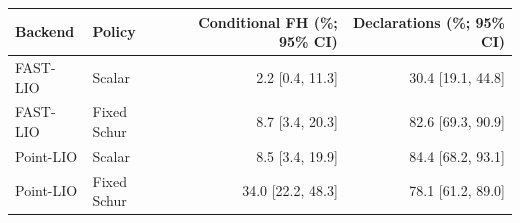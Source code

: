 \begin{tabular}{@{}llrr@{}}
\toprule
Backend & Policy & Conditional FH (\%; 95\% CI) & Declarations (\%; 95\% CI)\\\midrule
FAST-LIO & Scalar & 2.2 [0.4, 11.3] & 30.4 [19.1, 44.8]\\
FAST-LIO & Fixed Schur & 8.7 [3.4, 20.3] & 82.6 [69.3, 90.9]\\
Point-LIO & Scalar & 8.5 [3.4, 19.9] & 84.4 [68.2, 93.1]\\
Point-LIO & Fixed Schur & 34.0 [22.2, 48.3] & 78.1 [61.2, 89.0]\\
\bottomrule
\end{tabular}
